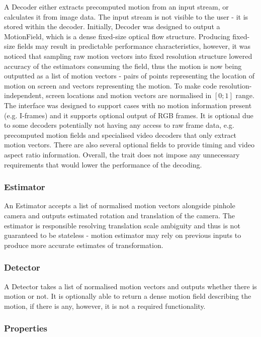 \documentclass[11pt,english]{report}
\begin{document}
A Decoder either extracts precomputed motion from an input stream, or calculates it from image data. The input stream is not visible to the user - it is stored within the decoder. Initially, Decoder was designed to output a MotionField, which is a dense fixed-size optical flow structure. Producing fixed-size fields may result in predictable performance characteristics, however, it was noticed that sampling raw motion vectors into fixed resolution structure lowered accuracy of the estimators consuming the field, thus the motion is now being outputted as a list of motion vectors - pairs of points representing the location of motion on screen and vectors representing the motion. To make code resolution-independent, screen locations and motion vectors are normalised in $[0; 1]$ range. The interface was designed to support cases with no motion information present (e.g. I-frames) and it supports optional output of RGB frames. It is optional due to some decoders potentially not having any access to raw frame data, e.g. precomputed motion fields and specialised video decoders that only extract motion vectors. There are also several optional fields to provide timing and video aspect ratio information. Overall, the trait does not impose any unnecessary requirements that would lower the performance of the decoding.

\subsubsection{Estimator}

An Estimator accepts a list of normalised motion vectors alongside pinhole camera and outputs estimated rotation and translation of the camera. The estimator is responsible resolving translation scale ambiguity and thus is not guaranteed to be stateless - motion estimator may rely on previous inputs to produce more accurate estimates of transformation.

\subsubsection{Detector}

A Detector takes a list of normalised motion vectors and outputs whether there is motion or not. It is optionally able to return a dense motion field describing the motion, if there is any, however, it is not a required functionality.

\subsubsection{Properties}
\end{document}
